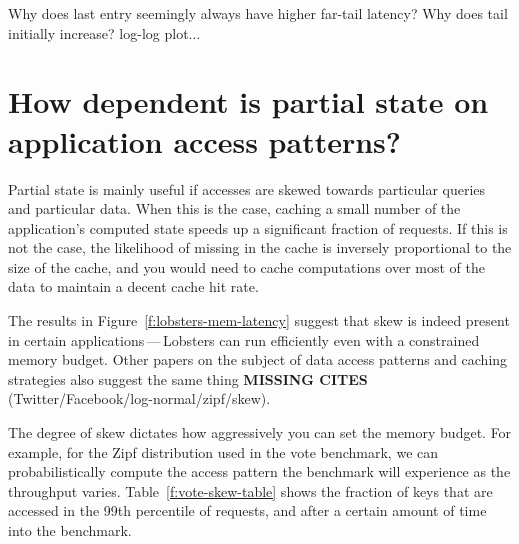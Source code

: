\begin{inprogress}
  Why does last entry seemingly always have higher far-tail latency?
  Why does tail initially increase?
  log-log plot...
\end{inprogress}

\section{How dependent is partial state on application access patterns?}
\label{s:eval:patterns}

Partial state is mainly useful if accesses are skewed towards particular queries
and particular data. When this is the case, caching a small number of the
application's computed state speeds up a significant fraction of requests. If
this is not the case, the likelihood of missing in the cache is inversely
proportional to the size of the cache, and you would need to cache computations
over most of the data to maintain a decent cache hit rate.

The results in Figure~\ref{f:lobsters-mem-latency} suggest that skew is indeed
present in certain applications\,---\,Lobsters can run efficiently even with a
constrained memory budget. Other papers on the subject of data access patterns
and caching strategies also suggest the same thing \textbf{MISSING CITES}
(Twitter/Facebook/log-normal/zipf/skew).

The degree of skew dictates how aggressively you can set the memory budget.
For example, for the Zipf distribution used in the vote benchmark, we can
probabilistically compute the access pattern the benchmark will experience as
the throughput varies. Table~\ref{f:vote-skew-table} shows the fraction of keys
that are accessed in the 99th percentile of requests, and after a certain amount
of time into the benchmark.

